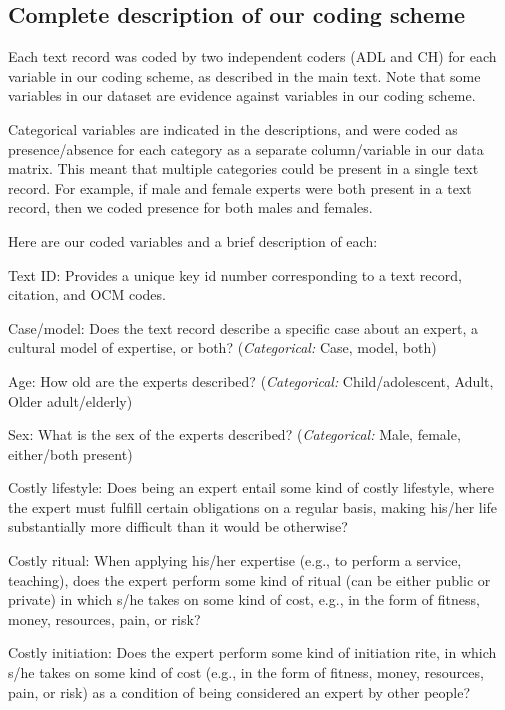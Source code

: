 \documentclass[
]{article}
\begin{document}
\hypertarget{complete-description-of-our-coding-scheme}{%
\subsection{Complete description of our coding scheme}\label{complete-description-of-our-coding-scheme}}

Each text record was coded by two independent coders (ADL and CH) for each variable in our coding scheme, as described in the main text. Note that some variables in our dataset are evidence against variables in our coding scheme.

Categorical variables are indicated in the descriptions, and were coded as presence/absence for each category as a separate column/variable in our data matrix. This meant that multiple categories could be present in a single text record. For example, if male and female experts were both present in a text record, then we coded presence for both males and females.

Here are our coded variables and a brief description of each:

Text ID: Provides a unique key id number corresponding to a text record, citation, and OCM codes.

Case/model: Does the text record describe a specific case about an expert, a cultural model of expertise, or both? (\emph{Categorical:} Case, model, both)

Age: How old are the experts described? (\emph{Categorical:} Child/adolescent, Adult, Older adult/elderly)

Sex: What is the sex of the experts described? (\emph{Categorical:} Male, female, either/both present)

Costly lifestyle: Does being an expert entail some kind of costly lifestyle, where the expert must fulfill certain obligations on a regular basis, making his/her life substantially more difficult than it would be otherwise?

Costly ritual: When applying his/her expertise (e.g., to perform a service, teaching), does the expert perform some kind of ritual (can be either public or private) in which s/he takes on some kind of cost, e.g., in the form of fitness, money, resources, pain, or risk?

Costly initiation: Does the expert perform some kind of initiation rite, in which s/he takes on some kind of cost (e.g., in the form of fitness, money, resources, pain, or risk) as a condition of being considered an expert by other people?
\end{document}
